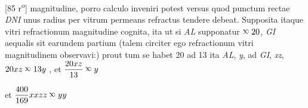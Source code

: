 [85 r\textsuperscript{o}]  magnitudine, porro calculo inveniri potest versus quod  punctum rectae \textit{DNI} unus  radius per vitrum permeans  refractus tendere debeat. Supposita itaque vitri refractionum  magnitudine cognita, ita ut si \textit{AL} supponatur  $^{\rotatebox{180}{$\propto$}}\: 20$, \textit{GI} aequalis sit  earundem partium (talem circiter ego  refractionum vitri magnitudinem observavi:) prout tum  se habet 20 ad 13 ita \textit{AL}, \textit{y}, ad \textit{GI}, \textit{xz}, $20 xz \:^{\rotatebox{180}{$\propto$}}\:13 y$%
                    , et $\displaystyle\frac{20xz}{13}\:^{\rotatebox{180}{$\propto$}}\:y$\rule[-4mm]{0mm}{10mm}  et $\displaystyle \frac{400}{169} xxzz \: ^{\rotatebox{180}{$\propto$}} \:yy$%
